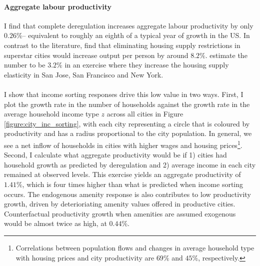 \documentclass[12pt]{article}
\begin{document}
\paragraph*{Aggregate labour productivity} I find that complete deregulation increases aggregate labour productivity by only $0.26 \%$-- equivalent to roughly an eighth of a typical year of growth in the US. In contrast to the literature, \cite{durantonpugaurbgrowth} find that eliminating housing supply restrictions in superstar cities would increase output per person by around $8.2\%$. \cite{hseihmoretti} estimate the number to be $3.2\%$ in an exercise where they increase the housing supply elasticity in San Jose, San Francisco and New York. 

\paragraph*{}
I show that income sorting responses drive this low value in two ways. First, I plot the growth rate in the number of households against the growth rate in the average household income type $z$ across all cities in Figure \ref{figure:city_inc_sorting}, with each city representing a circle that is coloured by productivity and has a radius proportional to the city population. In general, we see a net inflow of households in cities with higher wages and housing prices\footnote{Correlations between population flows and changes in average household type with housing prices and city productivity are $69\%$ and $45\%$, respectively.}. Second, I calculate what aggregate productivity would be if 1) cities had household growth as predicted by deregulation and 2) average income in each city remained at observed levels. This exercise yields an aggregate productivity of $1.41\%$, which is four times higher than what is predicted when income sorting occurs. The endogenous amenity response is also contributes to low productivity growth, driven by deterioriating amenity values offered in productive cities. Counterfactual productivity growth when amenities are assumed exogenous would be almost twice as high, at $0.44 \%$.
\end{document}

